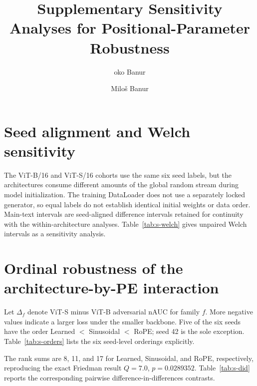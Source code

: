 \documentclass[preprint,12pt,authoryear]{elsarticle}
\begin{document}
\begin{frontmatter}
\title{Supplementary Sensitivity Analyses for Positional-Parameter Robustness}
\author[aff1]{\DJ{}oko Ban{\dj}ur}

\author[aff1]{Milo\v{s} Ban{\dj}ur}

\address[aff1]{Faculty of Technical Sciences, University of Priština, Kosovska Mitrovica, Serbia}
\end{frontmatter}

\section{Seed alignment and Welch sensitivity}

The ViT-B/16 and ViT-S/16 cohorts use the same six seed labels, but the
architectures consume different amounts of the global random stream during
model initialization. The training DataLoader does not use a separately
locked generator, so equal labels do not establish identical initial
weights or data order. Main-text intervals are seed-aligned difference
intervals retained for continuity with the within-architecture analyses.
Table~\ref{tab:s-welch} gives unpaired Welch intervals as a sensitivity
analysis.



\section{Ordinal robustness of the architecture-by-PE interaction}

Let $\Delta_f$ denote ViT-S minus ViT-B adversarial nAUC for family $f$.
More negative values indicate a larger loss under the smaller backbone.
Five of the six seeds have the order Learned $<$ Sinusoidal $<$ RoPE; seed
42 is the sole exception. Table~\ref{tab:s-orders} lists the six seed-level
orderings explicitly.



The rank sums are 8, 11, and 17 for Learned, Sinusoidal, and RoPE,
respectively, reproducing the exact Friedman result $Q=7.0$,
$p=0.0289352$. Table~\ref{tab:s-did} reports the corresponding
pairwise difference-in-differences contrasts.


\end{document}
